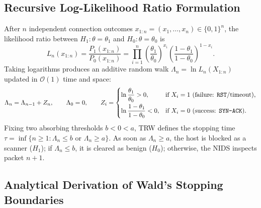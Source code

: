 \documentclass[oneside,noexaminfo,english]{sapthesis}
\numberwithin{equation}{section}
\numberwithin{figure}{section}
\numberwithin{table}{section}
\theoremstyle{compactplain}
\theoremstyle{compactdef}
\theoremstyle{compactrem}
\begin{document}
\subsection{Recursive Log-Likelihood Ratio Formulation}
After $n$ independent connection outcomes $x_{1:n} = (x_1, \dots, x_n) \in \{0,1\}^n$, the likelihood ratio between $H_1: \theta = \theta_1$ and $H_0: \theta = \theta_0$ is
\begin{equation}
    \label{eq:lr_prod}
    L_n(x_{1:n}) = \frac{P_1(x_{1:n})}{P_0(x_{1:n})} = \prod_{i=1}^n \left(\frac{\theta_1}{\theta_0}\right)^{x_i} \left(\frac{1-\theta_1}{1-\theta_0}\right)^{1-x_i}.
\end{equation}
Taking logarithms produces an additive random walk $\Lambda_n = \ln L_n(X_{1:n})$ updated in $\mathcal{O}(1)$ time and space:
\begin{equation}
    \label{eq:trw_recurrence}
    \Lambda_n = \Lambda_{n-1} + Z_n, \qquad \Lambda_0 = 0, \qquad
    Z_i = \begin{cases}
        \ln\dfrac{\theta_1}{\theta_0} > 0, & \text{if } X_i = 1 \text{ (failure: \texttt{RST}/timeout)}, \\[0.25cm]
        \ln\dfrac{1-\theta_1}{1-\theta_0} < 0, & \text{if } X_i = 0 \text{ (success: \texttt{SYN-ACK})}.
    \end{cases}
\end{equation}
Fixing two absorbing thresholds $b < 0 < a$, TRW defines the stopping time $\tau = \inf\{n \ge 1 : \Lambda_n \le b \text{ or } \Lambda_n \ge a\}$. As soon as $\Lambda_n \ge a$, the host is blocked as a scanner ($H_1$); if $\Lambda_n \le b$, it is cleared as benign ($H_0$); otherwise, the NIDS inspects packet $n+1$.

\subsection{Analytical Derivation of Wald's Stopping Boundaries}
\end{document}
